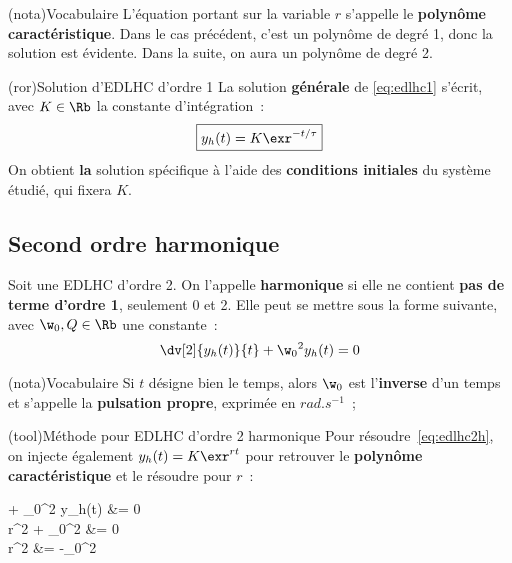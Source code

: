 \documentclass[a4paper, 11pt, garamond]{book}
\begin{document}
\begin{tcn}(nota){Vocabulaire}
	L'équation portant sur la variable $r$ s'appelle le \textbf{polynôme
		caractéristique}. Dans le cas précédent, c'est un polynôme de degré 1, donc la
	solution est évidente. Dans la suite, on aura un polynôme de degré 2.
\end{tcn}

\begin{tcn}(ror){Solution d'EDLHC d'ordre 1}
	La solution \textbf{générale} de \eqref{eq:edlhc1} s'écrit, avec $K \in \Rb$
	la constante d'intégration~:
	\[
		\boxed{y_h(t) = K\exr^{-t/\tau}}
	\]
	On obtient \textbf{la} solution spécifique à l'aide des \textbf{conditions
		initiales} du système étudié, qui fixera $K$.
\end{tcn}

\subsection{Second ordre harmonique}
Soit une EDLHC d'ordre 2. On l'appelle \textbf{harmonique} si elle ne contient
\textbf{pas de terme d'ordre 1}, seulement 0 et 2. Elle peut se mettre sous la
forme suivante, avec $\w_0,Q \in \Rb$ une constante~:
\begin{equation}
	\dv[2]{y_h(t)}{t} + \w_0{}^{2} y_h(t) = 0
	\label{eq:edlhc2h}
\end{equation}

\begin{tcn}(nota){Vocabulaire}
	Si $t$ désigne bien le temps, alors $\w_0$ est l'\textbf{inverse} d'un temps
	et s'appelle la \textbf{pulsation propre}, exprimée en $\si{rad.s^{-1}}$~;
\end{tcn}

\begin{tcn}[breakable](tool){Méthode pour EDLHC d'ordre 2 harmonique}
	Pour résoudre~\eqref{eq:edlhc2h}, on injecte également $y_h(t) = K\exr^{rt}$
	pour retrouver le \textbf{polynôme caractéristique} et le résoudre pour $r$~:
	\begin{DispWithArrows*}
		 + \w_0{}^2 y_h(t) &= 0
		\\\Ra
		r^2 \times {} + \w_0{}^2 &= 0
		\\\Lra
		r^2 &= -\w_0{}^2
		\\\Lra
	\end{DispWithArrows*}
\end{tcn}
\end{document}
